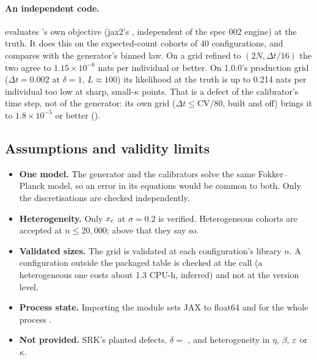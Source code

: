 \paragraph{An independent code.}  evaluates 's own objective
(jax2's , independent of the spec 002 engine) at the truth. It does this on the expected-count cohorts
of 40 configurations, and compares with the generator's binned law. On a grid refined to $(2N,\Delta t/16)$ the two
agree to $1.15\times10^{-6}$ nats per individual or better. On  1.0.0's production grid
($\Delta t=0.002$ at $\delta=1$, $L\approx100$) its likelihood at the truth is up to 0.214 nats per individual too
low at sharp, small-$\kappa$ points. That is a defect of the calibrator's time step, not of the generator: its own
 grid ($\Delta t\le\mathrm{CV}/80$, built and off) brings it to $1.8\times10^{-5}$ or better
().

\subsection{Assumptions and validity limits}\label{sec:gen-limits}

\begin{itemize}[nosep]
  \item \textbf{One model.} The generator and the calibrators solve the same Fokker--Planck model, so an error in its
    equations would be common to both. Only the discretisations are checked independently.
  \item \textbf{Heterogeneity.} Only $x_c$ at $\sigma=0.2$ is verified. Heterogeneous cohorts are accepted at
    $n\le20{,}000$; above that they say so.
  \item \textbf{Validated sizes.} The grid is validated at each configuration's library $n$. A configuration
    outside the packaged table is checked at the call (a heterogeneous one costs about 1.3 CPU-h, inferred) and not
    at the version level.
  \item \textbf{Process state.} Importing the module sets JAX to float64 and  for the whole
    process .
  \item \textbf{Not provided.} SRK's planted defects, $\delta=$ , and heterogeneity in $\eta$, $\beta$,
    $\varepsilon$ or $\kappa$.
\end{itemize}
